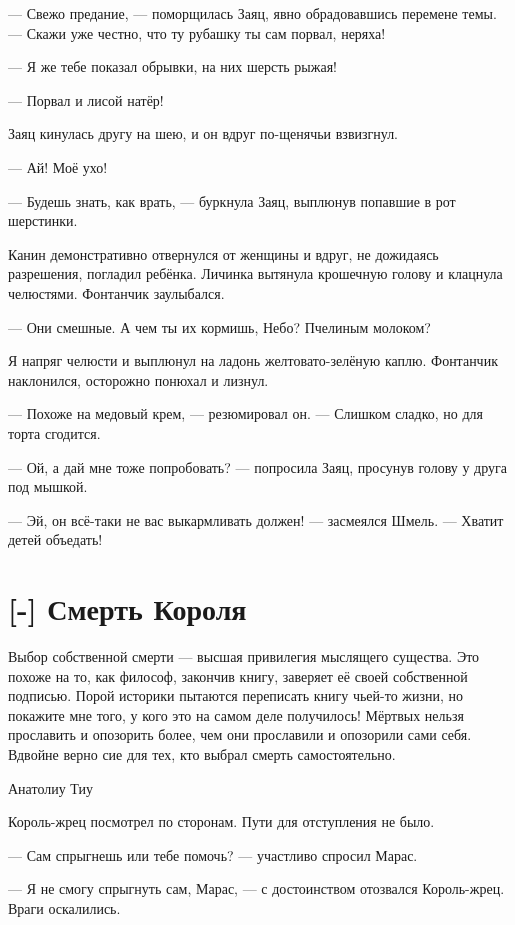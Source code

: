--- Свежо предание, --- поморщилась Заяц, явно обрадовавшись перемене темы.
--- Скажи уже честно, что ту рубашку ты сам порвал, неряха!

--- Я же тебе показал обрывки, на них шерсть рыжая!

--- Порвал и лисой натёр!

Заяц кинулась другу на шею, и он вдруг по-щенячьи взвизгнул.

--- Ай!
Моё ухо!

--- Будешь знать, как врать, --- буркнула Заяц, выплюнув попавшие в рот шерстинки.

Канин демонстративно отвернулся от женщины и вдруг, не дожидаясь разрешения, погладил ребёнка.
Личинка вытянула крошечную голову и клацнула челюстями.
Фонтанчик заулыбался.

--- Они смешные.
А чем ты их кормишь, Небо?
Пчелиным молоком?

Я напряг челюсти и выплюнул на ладонь желтовато-зелёную каплю.
Фонтанчик наклонился, осторожно понюхал и лизнул.

--- Похоже на медовый крем, --- резюмировал он.
--- Слишком сладко, но для торта сгодится.

--- Ой, а дай мне тоже попробовать? --- попросила Заяц, просунув голову у друга под мышкой.

--- Эй, он всё-таки не вас выкармливать должен! --- засмеялся Шмель.
--- Хватит детей объедать!

\section{[-] Смерть Короля}

\epigraph
{Выбор собственной смерти --- высшая привилегия мыслящего существа.
Это похоже на то, как философ, закончив книгу, заверяет её своей собственной подписью.
Порой историки пытаются переписать книгу чьей-то жизни, но покажите мне того, у кого это на самом деле получилось!
Мёртвых нельзя прославить и опозорить более, чем они прославили и опозорили сами себя.
Вдвойне верно сие для тех, кто выбрал смерть самостоятельно.}
{Анатолиу Тиу}

\textspace

Король-жрец посмотрел по сторонам.
Пути для отступления не было.

--- Сам спрыгнешь или тебе помочь? --- участливо спросил Марас.

--- Я не смогу спрыгнуть сам, Марас, --- с достоинством отозвался Король-жрец.
Враги оскалились.

